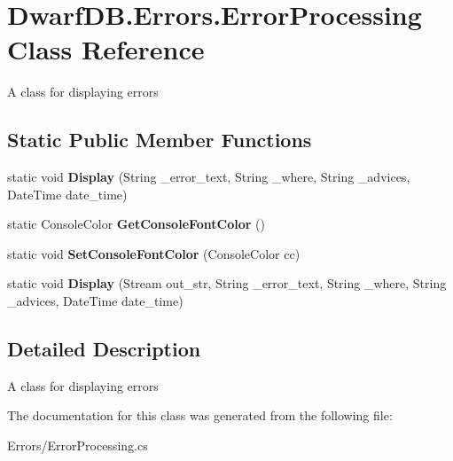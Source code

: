 \hypertarget{class_dwarf_d_b_1_1_errors_1_1_error_processing}{\section{Dwarf\+D\+B.\+Errors.\+Error\+Processing Class Reference}
\label{class_dwarf_d_b_1_1_errors_1_1_error_processing}
}


A class for displaying errors  


\subsection*{Static Public Member Functions}
\begin{DoxyCompactItemize}
\item 
\hypertarget{class_dwarf_d_b_1_1_errors_1_1_error_processing_a68c6bfa1f5bf2da33703992cfed77731}{static void {\bfseries Display} (String \+\_\+error\+\_\+text, String \+\_\+where, String \+\_\+advices, Date\+Time date\+\_\+time)}\label{class_dwarf_d_b_1_1_errors_1_1_error_processing_a68c6bfa1f5bf2da33703992cfed77731}

\item 
\hypertarget{class_dwarf_d_b_1_1_errors_1_1_error_processing_a051751b672ee28d2608be8a20652de8d}{static Console\+Color {\bfseries Get\+Console\+Font\+Color} ()}\label{class_dwarf_d_b_1_1_errors_1_1_error_processing_a051751b672ee28d2608be8a20652de8d}

\item 
\hypertarget{class_dwarf_d_b_1_1_errors_1_1_error_processing_a599cbddaaebbdeca35d795b2010254e6}{static void {\bfseries Set\+Console\+Font\+Color} (Console\+Color cc)}\label{class_dwarf_d_b_1_1_errors_1_1_error_processing_a599cbddaaebbdeca35d795b2010254e6}

\item 
\hypertarget{class_dwarf_d_b_1_1_errors_1_1_error_processing_aab993dd16fc5fb11db9ef496c6aa1980}{static void {\bfseries Display} (Stream out\+\_\+str, String \+\_\+error\+\_\+text, String \+\_\+where, String \+\_\+advices, Date\+Time date\+\_\+time)}\label{class_dwarf_d_b_1_1_errors_1_1_error_processing_aab993dd16fc5fb11db9ef496c6aa1980}

\end{DoxyCompactItemize}


\subsection{Detailed Description}
A class for displaying errors 



The documentation for this class was generated from the following file\+:\begin{DoxyCompactItemize}
\item 
Errors/Error\+Processing.\+cs\end{DoxyCompactItemize}
